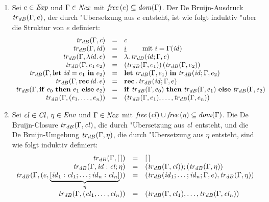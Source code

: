 \documentclass[12pt,fleqn,a4paper]{article}
\newcommand{\Cl}{\name{Cl}}
\newcommand{\cl}{\name{cl}}
\begin{document}
\begin{definition}["Ubersetzungsfunktion] \
  \begin{enumerate}
  \item Sei $e \in {\text{\it Exp\/}}$ und $\Gamma\in{\text{\it Ncx\/}}$ mit ${\text{\it free\/}}\,(e) \subseteq {\text{\it dom\/}}(\Gamma)$.
    Der De Bruijn-Ausdruck ${\text{\it tr\/}}_{dB}(\Gamma,e)$, der durch "Ubersetzung aus $e$ entsteht,
    ist wie folgt induktiv "uber die Struktur von $e$ definiert:
    \[\begin{array}{rcl}
      {\text{\it tr\/}}_{dB}(\Gamma,c) &=& c \\
      {\text{\it tr\/}}_{dB}(\Gamma,{\text{\it id\/}}) &=& \underline{i} \quad\quad \text{ mit } i = \Gamma({\text{\it id\/}}) \\
      {\text{\it tr\/}}_{dB}(\Gamma,\lambda {\text{\it id\/}}.\,e) &=& \lambda .\,{\text{\it tr\/}}_{dB}({\text{\it id\/}};\Gamma,e) \\
      {\text{\it tr\/}}_{dB}(\Gamma,e_1\,e_2) &=& ({\text{\it tr\/}}_{dB}(\Gamma,e_1))\,({\text{\it tr\/}}_{dB}(\Gamma,e_2)) \\
      {\text{\it tr\/}}_{dB}(\Gamma,\mathbf{let}\ {\text{\it id\/}} = e_1\ \mathbf{in}\ e_2) &=& \mathbf{let}\ {{\text{\it tr\/}}_{dB}(\Gamma,e_1)}\ \mathbf{in}\ {{\text{\it tr\/}}_{dB}({\text{\it id\/}};\Gamma,e_2)} \\
      {\text{\it tr\/}}_{dB}(\Gamma,\mathbf{rec}\,{\text{\it id\/}}.\,e) &=& \mathbf{rec}\,.\,{\text{\it tr\/}}_{dB}({\text{\it id\/}};\Gamma,e) \\
      {\text{\it tr\/}}_{dB}(\Gamma,\mathbf{if}\ e_0\ \mathbf{then}\ e_1\ \mathbf{else}\ e_2) &=& \mathbf{if}\ {\text{\it tr\/}}_{dB}(\Gamma,e_0)\ \mathbf{then}\ {\text{\it tr\/}}_{dB}(\Gamma,e_1)\ \mathbf{else}\ {\text{\it tr\/}}_{dB}(\Gamma,e_2) \\
      {\text{\it tr\/}}_{dB}(\Gamma,(e_1,\ldots,e_n)) &=& ({\text{\it tr\/}}_{dB}(\Gamma,e_1),\ldots,{\text{\it tr\/}}_{dB}(\Gamma,e_n)) \\
    \end{array}\]
  \item Sei $\cl \in \Cl$, $\eta \in {\text{\it Env\/}}$ und $\Gamma \in {\text{\it Ncx\/}}$ mit
    $\free{\cl} \cup \free{\eta} \subseteq \dom{\Gamma}$. Die De Bruijn-Closure $\trdB{\Gamma,\cl}$,
    die durch "Ubersetzung aus $\cl$ entsteht, und die De Bruijn-Umgebung ${\text{\it tr\/}}_{dB}(\Gamma,\eta)$, die
    durch "Ubersetzung aus $\eta$ entsteht, sind wie folgt induktiv definiert:
    \[\begin{array}{rcl}
      \trdB{\Gamma,[\,]} &=& [\,] \\
      \trdB{\Gamma,\id:\cl;\eta} &=& (\trdB{\Gamma,\cl});(\trdB{\Gamma,\eta}) \\
      \trdB{\Gamma,(e,\underbrace{[\id_1:\cl_1;\ldots;\id_n:\cl_n]}_{\eta})} &=& (\trdB{\id_1;\ldots;\id_n;\Gamma,e},\trdB{\Gamma,\eta}) \\
      \trdB{\Gamma,(\cl_1,\ldots,\cl_n)} &=& (\trdB{\Gamma,\cl_1},\ldots,\trdB{\Gamma,\cl_n}) \\
    \end{array}\]
  \end{enumerate}
\end{definition}
\end{document}
